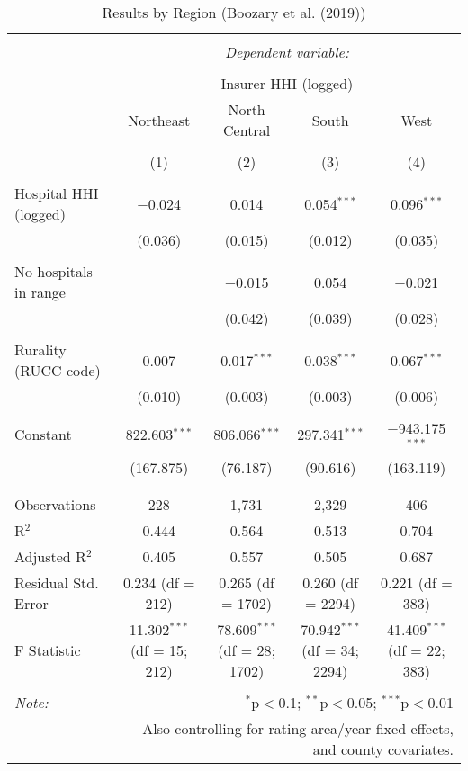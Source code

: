 
\begin{table}[!htbp] \centering 
  \caption{Results by Region (Boozary et al. (2019))} 
  \label{} 
\scriptsize 
\begin{tabular}{@{\extracolsep{5pt}}lcccc} 
\\[-1.8ex]\hline 
\hline \\[-1.8ex] 
 & \multicolumn{4}{c}{\textit{Dependent variable:}} \\ 
\cline{2-5} 
\\[-1.8ex] & \multicolumn{4}{c}{Insurer HHI (logged)} \\ 
 & Northeast & North Central & South & West \\ 
\\[-1.8ex] & (1) & (2) & (3) & (4)\\ 
\hline \\[-1.8ex] 
 Hospital HHI (logged) & $-$0.024 & 0.014 & 0.054$^{***}$ & 0.096$^{***}$ \\ 
  & (0.036) & (0.015) & (0.012) & (0.035) \\ 
  & & & & \\ 
 No hospitals in range &  & $-$0.015 & 0.054 & $-$0.021 \\ 
  &  & (0.042) & (0.039) & (0.028) \\ 
  & & & & \\ 
 Rurality (RUCC code) & 0.007 & 0.017$^{***}$ & 0.038$^{***}$ & 0.067$^{***}$ \\ 
  & (0.010) & (0.003) & (0.003) & (0.006) \\ 
  & & & & \\ 
 Constant & 822.603$^{***}$ & 806.066$^{***}$ & 297.341$^{***}$ & $-$943.175$^{***}$ \\ 
  & (167.875) & (76.187) & (90.616) & (163.119) \\ 
  & & & & \\ 
\hline \\[-1.8ex] 
Observations & 228 & 1,731 & 2,329 & 406 \\ 
R$^{2}$ & 0.444 & 0.564 & 0.513 & 0.704 \\ 
Adjusted R$^{2}$ & 0.405 & 0.557 & 0.505 & 0.687 \\ 
Residual Std. Error & 0.234 (df = 212) & 0.265 (df = 1702) & 0.260 (df = 2294) & 0.221 (df = 383) \\ 
F Statistic & 11.302$^{***}$ (df = 15; 212) & 78.609$^{***}$ (df = 28; 1702) & 70.942$^{***}$ (df = 34; 2294) & 41.409$^{***}$ (df = 22; 383) \\ 
\hline 
\hline \\[-1.8ex] 
\textit{Note:}  & \multicolumn{4}{r}{$^{*}$p$<$0.1; $^{**}$p$<$0.05; $^{***}$p$<$0.01} \\ 
 & \multicolumn{4}{r}{Also controlling for rating area/year fixed effects, and county covariates.} \\ 
\end{tabular} 
\end{table} 

